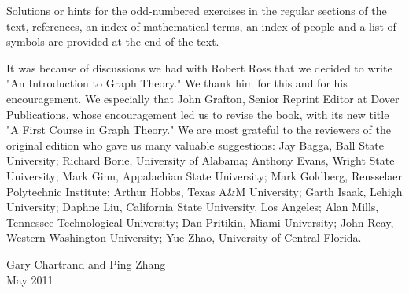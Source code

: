 Solutions or hints for the odd-numbered exercises in the regular sections of the text, references, an index of mathematical terms, an index of people and a list of symbols are provided at the end of the text.

It was because of discussions we had with Robert Ross that we decided to write "An Introduction to Graph Theory." We thank him for this and for his encouragement. We especially that John Grafton, Senior Reprint Editor at Dover Publications, whose encouragement led us to revise the book, with its new title "A First Course in Graph Theory." We are most grateful to the reviewers of the original edition who gave us many valuable suggestions: Jay Bagga, Ball State University; Richard Borie, University of Alabama; Anthony Evans, Wright State University; Mark Ginn, Appalachian State University; Mark Goldberg, Rensselaer Polytechnic Institute; Arthur Hobbs, Texas A\&M University; Garth Isaak, Lehigh University; Daphne Liu, California State University, Los Angeles; Alan Mills, Tennessee Technological University; Dan Pritikin, Miami University; John Reay, Western Washington University; Yue Zhao, University of Central Florida.

\begin{flushright}
Gary Chartrand and Ping Zhang\\
May 2011
\end{flushright}